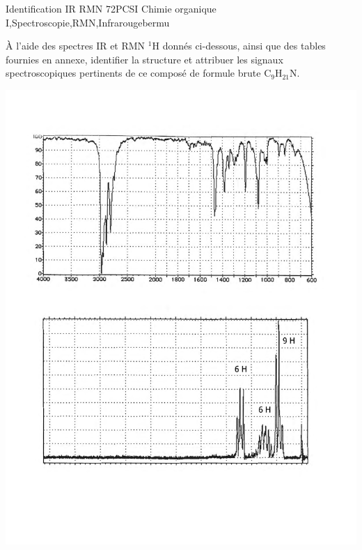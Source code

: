 \begin{exercise}{Identification IR RMN 7}{2}{PCSI}
{Chimie organique I,Spectroscopie,RMN,Infrarouge}{bermu}

À l'aide des spectres IR et RMN $^{1}$H donnés ci-dessous, ainsi que des tables fournies en annexe, identifier la structure et attribuer les signaux spectroscopiques pertinents de ce composé de formule brute $\mathrm{C_9H_{21}N}$.
 
\vspace{2em}
 
\includegraphics[width=\linewidth]{chimiePC/orga/IR_RMN_7.pdf}

\end{exercise}

\begin{solution}
\begin{center}
\end{center}
\end{solution}

